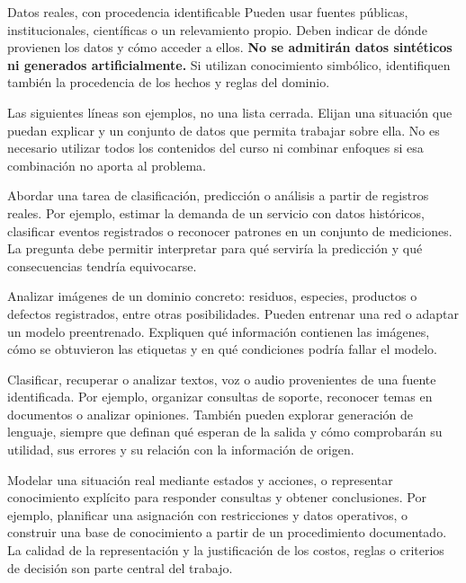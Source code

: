 \documentclass[11pt,a4paper]{article}
\begin{document}
\begin{destacado}{Datos reales, con procedencia identificable}
Pueden usar fuentes públicas, institucionales, científicas o un relevamiento propio. Deben indicar de dónde provienen los datos y cómo acceder a ellos. \textbf{No se admitirán datos sintéticos ni generados artificialmente.} Si utilizan conocimiento simbólico, identifiquen también la procedencia de los hechos y reglas del dominio.
\end{destacado}

\newpage
{}

Las siguientes líneas son ejemplos, no una lista cerrada. Elijan una situación que puedan explicar y un conjunto de datos que permita trabajar sobre ella. No es necesario utilizar todos los contenidos del curso ni combinar enfoques si esa combinación no aporta al problema.

Abordar una tarea de clasificación, predicción o análisis a partir de registros reales. Por ejemplo, estimar la demanda de un servicio con datos históricos, clasificar eventos registrados o reconocer patrones en un conjunto de mediciones. La pregunta debe permitir interpretar para qué serviría la predicción y qué consecuencias tendría equivocarse.

Analizar imágenes de un dominio concreto: residuos, especies, productos o defectos registrados, entre otras posibilidades. Pueden entrenar una red o adaptar un modelo preentrenado. Expliquen qué información contienen las imágenes, cómo se obtuvieron las etiquetas y en qué condiciones podría fallar el modelo.

Clasificar, recuperar o analizar textos, voz o audio provenientes de una fuente identificada. Por ejemplo, organizar consultas de soporte, reconocer temas en documentos o analizar opiniones. También pueden explorar generación de lenguaje, siempre que definan qué esperan de la salida y cómo comprobarán su utilidad, sus errores y su relación con la información de origen.

Modelar una situación real mediante estados y acciones, o representar conocimiento explícito para responder consultas y obtener conclusiones. Por ejemplo, planificar una asignación con restricciones y datos operativos, o construir una base de conocimiento a partir de un procedimiento documentado. La calidad de la representación y la justificación de los costos, reglas o criterios de decisión son parte central del trabajo.
\end{document}
